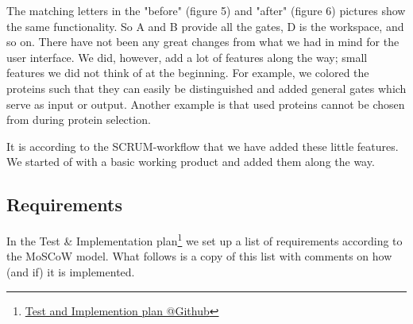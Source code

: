 \documentclass[a4paper]{article}
\makeatletter
\newcommand{\urlTestImplementation}{https://github.com/FelixAkk/synthbio/raw/master/deliverables/test-implementation/test-implementation.pdf}
\newcommand{\hrefTestImplementation}{\href{\urlTestImplementation}{Test and Implemention plan @Github}}
\makeatother
\begin{document}
The matching letters in the "before" (figure 5) and "after" (figure 6) pictures show the same functionality. So A and B provide all the gates, D is the workspace, and so on. There have not been any great changes from what we had in mind for the user interface. We did, however, add a lot of features along the way; small features we did not think of at the beginning. For example, we colored the proteins such that they can easily be distinguished and added general gates which serve as input or output. Another example is that used proteins cannot be chosen from during protein selection.

It is according to the SCRUM-workflow that we have added these little features. We started of with a basic working product and added them along the way.

\newpage
\subsection{Requirements}
In the Test \& Implementation plan\footnote{\hrefTestImplementation} we set up a list of requirements according to the MoSCoW model. What follows is a copy of this list with comments on how (and if) it is implemented.
\end{document}
